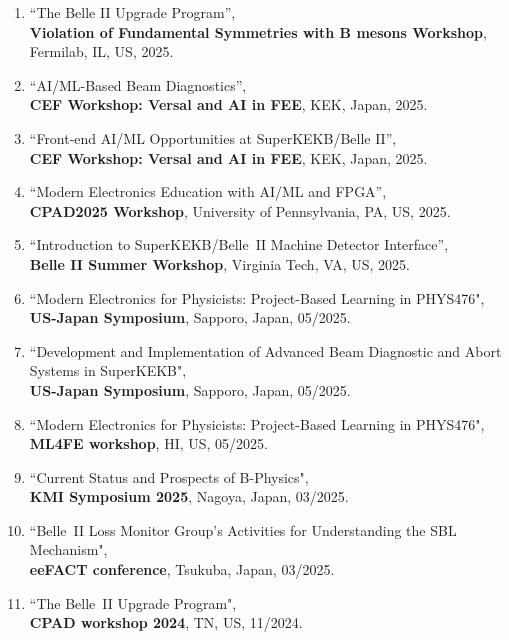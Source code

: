\documentclass[12pt]{article}
\renewcommand{\labelenumi}{[\arabic{enumi}]}
\begin{document}
{%
{\footnotesize
\begin{enumerate}
\renewcommand{\labelenumi}{[\arabic{enumi}]} 
\item {``The Belle II Upgrade Program'',\\
\textbf{Violation of Fundamental Symmetries with B mesons Workshop}, Fermilab, IL, US, 2025.}
\item {``AI/ML-Based Beam Diagnostics'',\\
\textbf{CEF Workshop: Versal and AI in FEE}, KEK, Japan, 2025.}
\item {``Front-end AI/ML Opportunities at SuperKEKB/Belle II'',\\
\textbf{CEF Workshop: Versal and AI in FEE}, KEK, Japan, 2025.}
\item {``Modern Electronics Education with AI/ML and FPGA'',\\
\textbf{CPAD2025 Workshop}, University of Pennsylvania, PA, US, 2025.}
\item {``Introduction to SuperKEKB/Belle~II Machine Detector Interface'',\\
\textbf{Belle II Summer Workshop}, Virginia Tech, VA, US, 2025.}
\item {``Modern Electronics for Physicists: Project-Based Learning in PHYS476",\\ \textbf{US-Japan Symposium}, Sapporo, Japan, 05/2025.} 
\item {``Development and Implementation of Advanced Beam Diagnostic and Abort Systems in SuperKEKB",\\ \textbf{US-Japan Symposium}, Sapporo, Japan, 05/2025.} 
\item {``Modern Electronics for Physicists: Project-Based Learning in PHYS476",\\ \textbf{ML4FE workshop}, HI, US, 05/2025.} 
\item {``Current Status and Prospects of B-Physics",\\ \textbf{KMI Symposium 2025}, Nagoya, Japan, 03/2025.} 
\item {``Belle~II Loss Monitor Group's Activities for Understanding the SBL Mechanism",\\ \textbf{eeFACT conference}, Tsukuba, Japan, 03/2025.} 
\item {``The Belle~II Upgrade Program",\\ \textbf{CPAD workshop 2024}, TN, US, 11/2024.} 

\end{enumerate}}}
\end{document}
